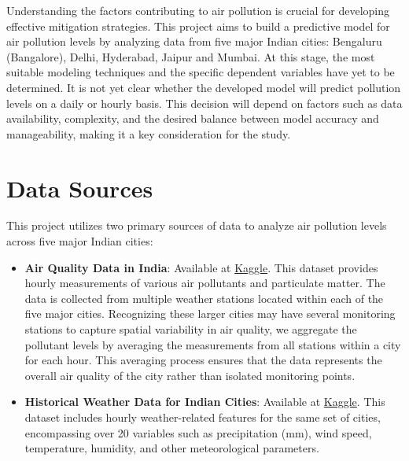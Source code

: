 \documentclass[12pt]{article}
\begin{document}
Understanding the factors contributing to air pollution is crucial for developing effective mitigation strategies. This project aims to build a predictive model for air pollution levels by analyzing data from five major Indian cities: Bengaluru (Bangalore), Delhi, Hyderabad, Jaipur and Mumbai. At this stage, the most suitable modeling techniques and the specific dependent variables have yet to be determined. It is not yet clear whether the developed model will predict pollution levels on a daily or hourly basis. This decision will depend on factors such as data availability, complexity, and the desired balance between model accuracy and manageability, making it a key consideration for the study.

\newpage




\section{Data Sources}

This project utilizes two primary sources of data to analyze air pollution levels across five major Indian cities:

\begin{itemize}
    \item \textbf{Air Quality Data in India}: Available at \href{https://www.kaggle.com/datasets/rohanrao/air-quality-data-in-india}{Kaggle}. This dataset provides hourly measurements of various air pollutants and particulate matter. The data is collected from multiple weather stations located within each of the five major cities. Recognizing these larger cities may have several monitoring stations to capture spatial variability in air quality, we aggregate the pollutant levels by averaging the measurements from all stations within a city for each hour. This averaging process ensures that the data represents the overall air quality of the city rather than isolated monitoring points.

    \item \textbf{Historical Weather Data for Indian Cities}\cite{hitesh_soneji_2020}: Available at \href{https://www.kaggle.com/datasets/hiteshsoneji/historical-weather-data-for-indian-cities}{Kaggle}. This dataset includes hourly weather-related features for the same set of cities, encompassing over 20 variables such as precipitation (mm), wind speed, temperature, humidity, and other meteorological parameters.
\end{itemize}
\end{document}
